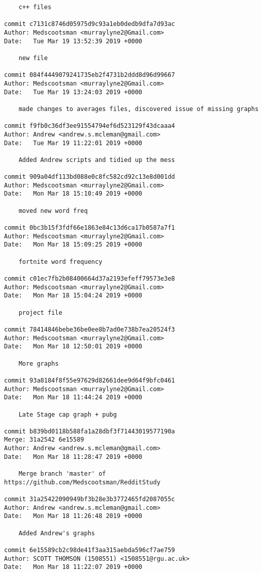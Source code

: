 \begin{lstlisting}
    c++ files

commit c7131c8746d05975d9c93a1eb0dedb9dfa7d93ac
Author: Medscootsman <murraylyne2@Gmail.com>
Date:   Tue Mar 19 13:52:39 2019 +0000

    new file

commit 084f4449079241735eb2f4731b2ddd8d96d99667
Author: Medscootsman <murraylyne2@Gmail.com>
Date:   Tue Mar 19 13:24:03 2019 +0000

    made changes to averages files, discovered issue of missing graphs

commit f9fb0c36df3ee91554794ef6d523129f43dcaaa4
Author: Andrew <andrew.s.mcleman@gmail.com>
Date:   Tue Mar 19 11:22:01 2019 +0000

    Added Andrew scripts and tidied up the mess

commit 909a04df113bd088e0c8fc582cd92c13e8d001dd
Author: Medscootsman <murraylyne2@Gmail.com>
Date:   Mon Mar 18 15:10:49 2019 +0000

    moved new word freq

commit 0bc3b15f3fdf66e1863e84c13d6ca17b0587a7f1
Author: Medscootsman <murraylyne2@Gmail.com>
Date:   Mon Mar 18 15:09:25 2019 +0000

    fortnite word frequency

commit c01ec7fb2b08400664d37a2193efeff79573e3e8
Author: Medscootsman <murraylyne2@Gmail.com>
Date:   Mon Mar 18 15:04:24 2019 +0000

    project file

commit 78414846bebe36be0ee8b7ad0e738b7ea20524f3
Author: Medscootsman <murraylyne2@Gmail.com>
Date:   Mon Mar 18 12:50:01 2019 +0000

    More graphs

commit 93a8184f8f55e97629d82661dee9d64f9bfc0461
Author: Medscootsman <murraylyne2@Gmail.com>
Date:   Mon Mar 18 11:44:24 2019 +0000

    Late Stage cap graph + pubg

commit b839bd0118b588fa1a28dbf3f71443019577190a
Merge: 31a2542 6e15589
Author: Andrew <andrew.s.mcleman@gmail.com>
Date:   Mon Mar 18 11:28:47 2019 +0000

    Merge branch 'master' of https://github.com/Medscootsman/RedditStudy

commit 31a25422090949bf3b28e3b3772465fd2087055c
Author: Andrew <andrew.s.mcleman@gmail.com>
Date:   Mon Mar 18 11:26:48 2019 +0000

    Added Andrew's graphs

commit 6e15589cb2c98de41f3aa315aebda596cf7ae759
Author: SCOTT THOMSON (1508551) <1508551@rgu.ac.uk>
Date:   Mon Mar 18 11:22:07 2019 +0000


\end{lstlisting}
